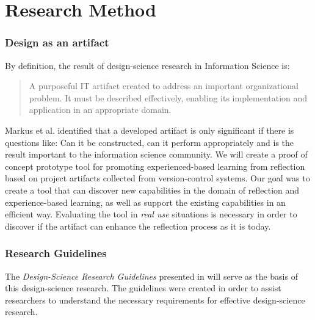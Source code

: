 %
%
\section{Research Method}


\subsubsection{Design as an artifact}
By definition, the result of design-science research in Information Science is:
\begin{quote}
A purposeful IT artifact created to address an important organizational problem. It must be described effectively, enabling its implementation and application in an appropriate domain.
\end{quote}
Markus et al.\citep{markusetal} identified that a developed artifact is only significant if there is questions like: Can it be constructed, can it perform appropriately and is the result important to the information science community. 
We will create a proof of concept prototype tool for promoting experienced-based learning from reflection based on project artifacts collected from version-control systems. Our goal was to create a tool that can discover new capabilities in the domain of reflection and experience-based learning, as well as support the existing capabilities in an efficient way. Evaluating the tool in \emph{real use} situations is necessary in order to discover if the artifact can enhance the reflection process as it is today.

\subsubsection{Research Guidelines}
The \emph{Design-Science Research Guidelines} presented in \citep{Esearch2004} will serve as the basis of this design-science research. The guidelines were created in order to assist researchers to understand the necessary requirements for effective design-science research. 

